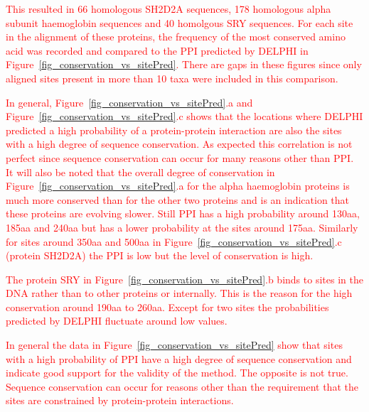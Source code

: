 \documentclass{bioinfo}
\newcommand{\mySecondColor}{red}
\begin{document}
\textcolor{\mySecondColor}{This resulted in 66 homologous SH2D2A sequences, 178 homologous alpha
subunit haemoglobin sequences and 40 homolgous SRY sequences.  For each
site in the alignment of these proteins, the frequency of the most
conserved amino acid was recorded and compared to the PPI predicted by
DELPHI in Figure~\ref{fig_conservation_vs_sitePred}.  There are gaps in these figures since only aligned
sites present in more than 10 taxa were included in this comparison.}

\textcolor{\mySecondColor}{In general, Figure~\ref{fig_conservation_vs_sitePred}.a and Figure~\ref{fig_conservation_vs_sitePred}.c shows that the locations where
DELPHI predicted a high probability of a protein-protein interaction are
also the sites with a high degree of sequence conservation.  As expected
this correlation is not perfect since sequence conservation can occur
for many reasons other than PPI.  It will also be noted that the overall
degree of conservation in Figure~\ref{fig_conservation_vs_sitePred}.a for the alpha haemoglobin proteins is
much more conserved than for the other two proteins and is an indication
that these proteins are evolving slower.  Still PPI has a high probability
around 130aa, 185aa and 240aa but has a lower probability at the sites
around 175aa.  Similarly for sites around 350aa and 500aa in Figure~\ref{fig_conservation_vs_sitePred}.c
(protein SH2D2A) the PPI is low but the level of conservation is high.}

\textcolor{\mySecondColor}{The protein SRY in Figure~\ref{fig_conservation_vs_sitePred}.b binds to sites in the DNA rather
than to other proteins or internally.  This is the reason for the
high conservation around 190aa to 260aa.  Except for two sites the
probabilities predicted by DELPHI fluctuate around low values.}

\textcolor{\mySecondColor}{In general the data in Figure~\ref{fig_conservation_vs_sitePred} show that sites with a high probability
of PPI have a high degree of sequence conservation and indicate good
support for the validity of the method.  The opposite is not true.
Sequence conservation can occur for reasons other than the requirement
that the sites are constrained by protein-protein interactions.}
\end{document}
